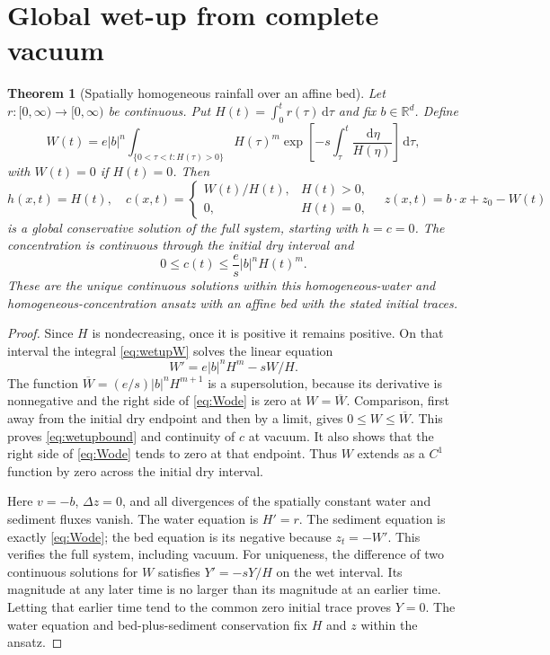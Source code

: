 \documentclass[11pt,a4paper]{article}
\newtheorem{theorem}{Theorem}[section]
\theoremstyle{remark}\newtheorem{remark}[theorem]{Remark}
\newcommand{\R}{\mathbb R}\newcommand{\divg}{\operatorname{div}}\newcommand{\dd}{\,\mathrm d}
\begin{document}
\section{Global wet-up from complete vacuum}
\begin{theorem}[Spatially homogeneous rainfall over an affine bed]\label{thm:wetup}
Let $r:[0,\infty)\to[0,\infty)$ be continuous. Put $H(t)=\int_0^t r(\tau)\dd\tau$ and fix $b\in\R^d$. Define
\begin{equation}
 W(t)=e|b|^n\int_{\{0<\tau<t:H(\tau)>0\}}
 H(\tau)^m\exp\!\left[-s\int_\tau^t\frac{\dd\eta}{H(\eta)}\right]\dd\tau,\label{eq:wetupW}
\end{equation}
with $W(t)=0$ if $H(t)=0$. Then
\begin{equation}
 h(x,t)=H(t),\quad
 c(x,t)=\begin{cases}W(t)/H(t),&H(t)>0,\\0,&H(t)=0,\end{cases}
 \quad z(x,t)=b\cdot x+z_0-W(t)\label{eq:wetup}
\end{equation}
is a global conservative solution of the full system, starting with $h=c=0$. The concentration is continuous through the initial dry interval and
\begin{equation}
 0\leq c(t)\leq\frac es|b|^n H(t)^m.\label{eq:wetupbound}
\end{equation}
These are the unique continuous solutions within this homogeneous-water and homogeneous-concentration ansatz with an affine bed with the stated initial traces.
\end{theorem}
\begin{proof}
Since $H$ is nondecreasing, once it is positive it remains positive. On that interval the integral \eqref{eq:wetupW} solves the linear equation
\begin{equation}
 W'=e|b|^n H^m-sW/H.\label{eq:Wode}
\end{equation}
The function $\overline W=(e/s)|b|^nH^{m+1}$ is a supersolution, because its derivative is nonnegative and the right side of \eqref{eq:Wode} is zero at $W=\overline W$. Comparison, first away from the initial dry endpoint and then by a limit, gives $0\leq W\leq\overline W$. This proves \eqref{eq:wetupbound} and continuity of $c$ at vacuum. It also shows that the right side of \eqref{eq:Wode} tends to zero at that endpoint. Thus $W$ extends as a $C^1$ function by zero across the initial dry interval.

Here $v=-b$, $\Delta z=0$, and all divergences of the spatially constant water and sediment fluxes vanish. The water equation is $H'=r$. The sediment equation is exactly \eqref{eq:Wode}; the bed equation is its negative because $z_t=-W'$. This verifies the full system, including vacuum. For uniqueness, the difference of two continuous solutions for $W$ satisfies $Y'=-sY/H$ on the wet interval. Its magnitude at any later time is no larger than its magnitude at an earlier time. Letting that earlier time tend to the common zero initial trace proves $Y=0$. The water equation and bed-plus-sediment conservation fix $H$ and $z$ within the ansatz.
\end{proof}
\end{document}
